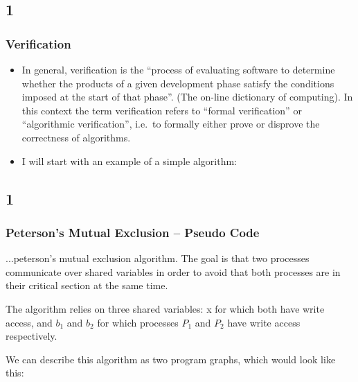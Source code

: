 \documentclass[handout]{beamer}
\begin{document}
\begin{footnotesize}
\subsection*{1}
\begin{frame}
  \frametitle{Verification}
  \begin{itemize}
  \item
  In general, verification is the ``process of evaluating software to determine whether the products of a given development phase satisfy the conditions imposed at the start of that phase''. (The on-line dictionary of computing). In this context the term verification refers to ``formal verification'' or ``algorithmic verification'', i.e.\ to formally either prove or disprove the correctness of algorithms.
 \item
I will start with an example of a simple algorithm:
  \end{itemize}
\end{frame}

\subsection*{1}
\begin{frame}
  \frametitle{Peterson's Mutual Exclusion -- Pseudo Code}
...peterson's mutual exclusion algorithm. The goal is that two processes communicate over shared variables in order to avoid that both processes are in their critical section at the same time.

The algorithm relies on three shared variables: x for which both have write access, and $b_1$ and $b_2$ for which processes $P_1$ and $P_2$ have write access respectively.

We can describe this algorithm as two program graphs, which would look like this:
\end{frame}


\end{footnotesize}
\end{document}
